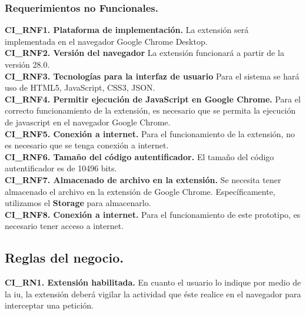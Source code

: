 \documentclass[12pt, a4paper, titlepage]{report}
\begin{document}
				\subsubsection{Requerimientos no Funcionales.}
				{\setlength{\parindent}{12pt}
				
				\textbf{CI\_RNF1. Plataforma de implementación.} La extensión será implementada en el navegador Google Chrome Desktop.\\
				
				\textbf{CI\_RNF2. Versión del navegador} La extensión funcionará a partir de la versión 28.0.\\
				
				\textbf{CI\_RNF3. Tecnologías para la interfaz de usuario} Para el sistema se hará uso de HTML5, JavaScript, CSS3, JSON.\\
				
				\textbf{CI\_RNF4. Permitir ejecución de JavaScript en Google Chrome.} Para el correcto funcionamiento de la extensión, es necesario que se permita la ejecución de javascript en el navegador Google Chrome.\\
				
				\textbf{CI\_RNF5. Conexión a internet.} Para el funcionamiento de la extensión, no es necesario que se tenga conexión a internet.\\
				
				\textbf{CI\_RNF6. Tamaño del código autentificador.} El tamaño del código autentificador es de 10496 bits.\\
				
				\textbf{CI\_RNF7. Almacenado de archivo en la extensión.} Se necesita tener almacenado el archivo en la extensión de Google Chrome. Específicamente, utilizamos el \textbf{Storage} para almacenarlo. \\
				
				\textbf{CI\_RNF8. Conexión a internet.} Para el funcionamiento de este prototipo, es necesario tener acceso a internet. \\
				
				}
		    
		    \subsection{Reglas del negocio.}
		    
		    \textbf{CI\_RN1. Extensión habilitada.} En cuanto el usuario lo indique por medio de la \acrlong{iu}, la extensión deberá vigilar la actividad que éste realice en el navegador para interceptar una petición.\\
			\label{CI_RN1}
			
\end{document}
